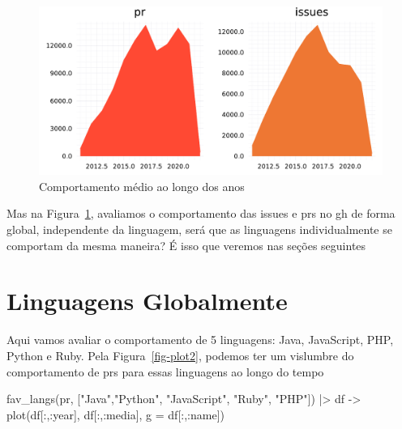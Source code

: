 \documentclass[
  letterpaper,
  DIV=11,
  numbers=noendperiod]{scrartcl}
\newenvironment{Shaded}{\begin{snugshade}}{\end{snugshade}}
\newcommand{\FunctionTok}[1]{\textcolor[rgb]{0.28,0.35,0.67}{#1}}
\newcommand{\NormalTok}[1]{\textcolor[rgb]{0.00,0.23,0.31}{#1}}
\newcommand{\OperatorTok}[1]{\textcolor[rgb]{0.37,0.37,0.37}{#1}}
\newcommand{\StringTok}[1]{\textcolor[rgb]{0.13,0.47,0.30}{#1}}
\begin{document}
\begin{figure}[H]

{\centering \includegraphics{report_files/figure-pdf/fig-plot-output-1.pdf}

}

\caption{\label{fig-plot}Comportamento médio ao longo dos anos}

\end{figure}

Mas na Figura~\ref{fig-plot}, avaliamos o comportamento das issues e prs
no gh de forma global, independente da linguagem, será que as linguagens
individualmente se comportam da mesma maneira? É isso que veremos nas
seções seguintes

\section{Linguagens Globalmente}

Aqui vamos avaliar o comportamento de 5 linguagens: Java, JavaScript,
PHP, Python e Ruby. Pela Figura~\ref{fig-plot2}, podemos ter um
vislumbre do comportamento de prs para essas linguagens ao longo do
tempo

\begin{Shaded}
\begin{Highlighting}[]
\FunctionTok{fav\_langs}\NormalTok{(pr, [}\StringTok{"Java"}\NormalTok{,}\StringTok{"Python"}\NormalTok{, }\StringTok{"JavaScript"}\NormalTok{, }\StringTok{"Ruby"}\NormalTok{, }\StringTok{"PHP"}\NormalTok{]) }\OperatorTok{|\textgreater{}} 
\NormalTok{      df }\OperatorTok{{-}\textgreater{}} \FunctionTok{plot}\NormalTok{(df[}\OperatorTok{:}\NormalTok{,}\OperatorTok{:}\NormalTok{year], df[}\OperatorTok{:}\NormalTok{,}\OperatorTok{:}\NormalTok{media], g }\OperatorTok{=}\NormalTok{ df[}\OperatorTok{:}\NormalTok{,}\OperatorTok{:}\NormalTok{name])}
\end{Highlighting}
\end{Shaded}
\end{document}
